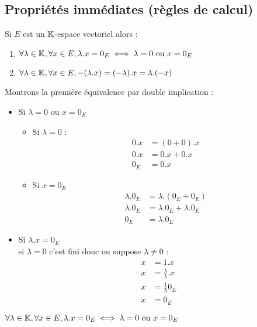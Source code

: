 \subsection{Propriétés immédiates (règles de calcul)}
\begin{prop}
    Si \(E\) est un \( \mathbb{K}\)-espace vectoriel alors :
    \begin{enumerate}
        \item\( \forall \lambda \in  \mathbb{K}, \forall x \in  E, \lambda.x = 0_E \iff \lambda = 0 \text{ ou }x = 0_E \)
        \item\( \forall \lambda \in  \mathbb{K}, \forall x \in  E, -(\lambda.x) = (-\lambda).x = \lambda.(-x)\)
    \end{enumerate}
\end{prop}
\begin{dem}
    Montrons la première équivalence par double implication :
    \begin{itemize}
        \item \imprec Si \(\lambda = 0\) ou  \(x = 0_E\)
        \begin{itemize}
            \item Si \(\lambda = 0\) :
            \begin{align*}
                0.x &= (0+0).x\\
                0.x & = 0.x + 0.x \\
                0_E &= 0.x
            \end{align*}
            \item Si \(x = 0_E\)
            \begin{align*}
                \lambda.0_E &= \lambda.(0_E + 0_E)\\
                \lambda.0_E &= \lambda.0_E + \lambda.0_E \\
                0_E &= \lambda.0_E
            \end{align*}
        \end{itemize}
        \item Si \(\lambda.x = 0_E\)\\
        si \(\lambda = 0\) c'est fini donc on suppose \(\lambda \neq 0\) :
        \begin{align*}
            x &= 1.x \\
            x &= \frac{\lambda}{\lambda}.x \\
            x &= \frac{1}{\lambda} 0_E\\
            x &= 0_E
        \end{align*}
    \end{itemize}
    \conclusion \( \forall \lambda \in  \mathbb{K}, \forall x \in  E, \lambda.x = 0_E \iff \lambda = 0 \text{ ou }x = 0_E \)
\end{dem}
